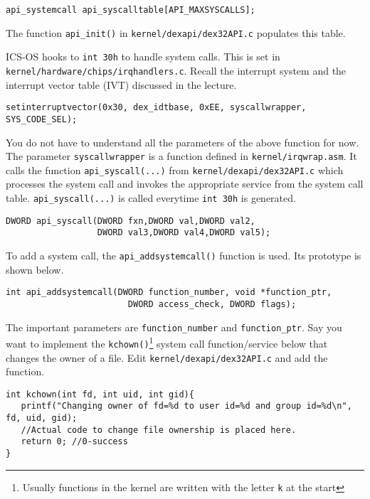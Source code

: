 \documentclass[a4paper, 11pt,oneside]{article}
\begin{document}
\begin{verbatim}
api_systemcall api_syscalltable[API_MAXSYSCALLS];
\end{verbatim}

The function \texttt{api\_init()} in \texttt{kernel/dexapi/dex32API.c}
populates this table. 

ICS-OS hooks to \texttt{int 30h} to handle system calls. This is set in
\texttt{kernel/hardware/chips/irqhandlers.c}. Recall the interrupt system 
and the interrupt vector table (IVT) discussed in the lecture.

\begin{verbatim}
setinterruptvector(0x30, dex_idtbase, 0xEE, syscallwrapper, SYS_CODE_SEL); 
\end{verbatim}

You do not have to understand all the parameters of the above function for now. 
The parameter \texttt{syscallwrapper} is a function defined in 
\texttt{kernel/irqwrap.asm}. It calls the function \texttt{api\_syscall(...)} 
from \texttt{kernel/dexapi/dex32API.c} which processes the system call and 
invokes the appropriate service from the system call table. 
\texttt{api\_syscall(...)} is called everytime \texttt{int 30h} is generated.

\begin{verbatim}
DWORD api_syscall(DWORD fxn,DWORD val,DWORD val2,
                  DWORD val3,DWORD val4,DWORD val5);
\end{verbatim}


To add a system call, the \texttt{api\_addsystemcall()} function is used. Its 
prototype is shown below.
\begin{verbatim}
int api_addsystemcall(DWORD function_number, void *function_ptr,
                        DWORD access_check, DWORD flags);
\end{verbatim}

The important parameters are \texttt{function\_number} and 
\texttt{function\_ptr}. Say you want to implement the 
\texttt{kchown()}\footnote{Usually functions in the kernel are written with the 
letter \texttt{k} at the start} system call function/service below that changes 
the owner of a file. Edit \texttt{kernel/dexapi/dex32API.c} and add the 
function.

\begin{verbatim}
int kchown(int fd, int uid, int gid){
   printf("Changing owner of fd=%d to user id=%d and group id=%d\n", fd, uid, gid);
   //Actual code to change file ownership is placed here.   
   return 0; //0-success
}
\end{verbatim}
\end{document}
